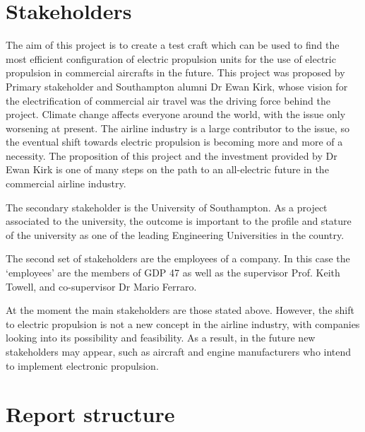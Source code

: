 \documentclass[../../main.tex]{subfiles}
\begin{document}
\section{Stakeholders} \label{sec:introduction:stakeholders}


The aim of this project is to create a test craft which can be used to find the most efficient configuration of electric propulsion units for the use of electric propulsion in commercial aircrafts in the future.
This project was proposed by Primary stakeholder and Southampton alumni Dr Ewan Kirk, whose vision for the electrification of commercial air travel was the driving force behind the project.
Climate change affects everyone around the world, with the issue only worsening at present.
The airline industry is a large contributor to the issue, so the eventual shift towards electric propulsion is becoming more and more of a necessity.
The proposition of this project and the investment provided by Dr Ewan Kirk is one of many steps on the path to an all-electric future in the commercial airline industry.  

The secondary stakeholder is the University of Southampton.
As a project associated to the university, the outcome is important to the profile and stature of the university as one of the leading Engineering Universities in the country. 

The second set of stakeholders are the employees of a company.
In this case the ‘employees’ are the members of GDP 47 as well as the supervisor Prof. Keith Towell, and co-supervisor Dr Mario Ferraro. 

At the moment the main stakeholders are those stated above.
However, the shift to electric propulsion is not a new concept in the airline industry, with companies looking into its possibility and feasibility.
As a result, in the future new stakeholders may appear, such as aircraft and engine manufacturers who intend to implement electronic propulsion.

\section{Report structure} \label{sec:introduction:report-structure}

\end{document}
